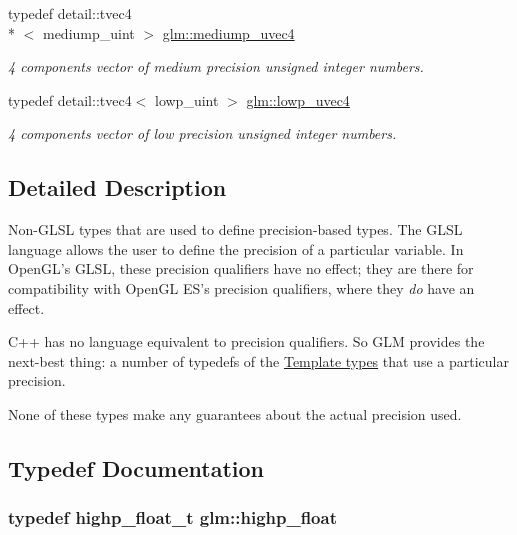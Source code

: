 \begin{DoxyCompactItemize}
typedef detail\-::tvec4\\*
$<$ mediump\-\_\-uint $>$ \hyperlink{group__core__precision_ga50b1bc4e07de623f15ec5a319c85609f}{glm\-::mediump\-\_\-uvec4}
\begin{DoxyCompactList}\small\item\em 4 components vector of medium precision unsigned integer numbers. \end{DoxyCompactList}\item 
typedef detail\-::tvec4$<$ lowp\-\_\-uint $>$ \hyperlink{group__core__precision_gae312816bc8b9b803de46b9fb2da036eb}{glm\-::lowp\-\_\-uvec4}
\begin{DoxyCompactList}\small\item\em 4 components vector of low precision unsigned integer numbers. \end{DoxyCompactList}\end{DoxyCompactItemize}


\subsection{Detailed Description}
Non-\/\-G\-L\-S\-L types that are used to define precision-\/based types. The G\-L\-S\-L language allows the user to define the precision of a particular variable. In Open\-G\-L's G\-L\-S\-L, these precision qualifiers have no effect; they are there for compatibility with Open\-G\-L E\-S's precision qualifiers, where they {\itshape do} have an effect.

C++ has no language equivalent to precision qualifiers. So G\-L\-M provides the next-\/best thing\-: a number of typedefs of the \hyperlink{group__core__template}{Template types} that use a particular precision.

None of these types make any guarantees about the actual precision used. 

\subsection{Typedef Documentation}
\hypertarget{group__core__precision_ga3d443a093adc053638ed7f81c5bfe300}{
\subsubsection[{highp\-\_\-float}]{\setlength{\rightskip}{0pt plus 5cm}typedef highp\-\_\-float\-\_\-t {\bf glm\-::highp\-\_\-float}}}\label{group__core__precision_ga3d443a093adc053638ed7f81c5bfe300}


